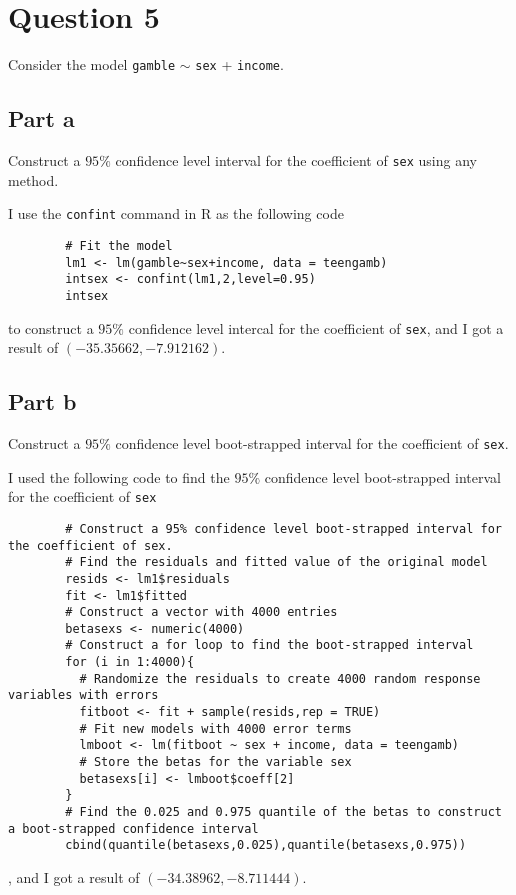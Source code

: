 \section{Question 5}

\begin{question}
    Consider the model \verb+gamble+ $\sim$ \verb+sex+ + \verb+income+.
\end{question}

\subsection{Part a}

\begin{question}
    Construct a $95\%$ confidence level interval for the coefficient of \verb+sex+ using any method.
\end{question}

\begin{answer}
    I use the \verb+confint+ command in R as the following code
    \begin{verbatim}
        # Fit the model
        lm1 <- lm(gamble~sex+income, data = teengamb)
        intsex <- confint(lm1,2,level=0.95)
        intsex
    \end{verbatim}
    to construct a $95\%$ confidence level intercal for the coefficient of \verb+sex+, and I got a result of $(-35.35662,-7.912162)$.
\end{answer}

\subsection{Part b}

\begin{question}
    Construct a $95\%$ confidence level boot-strapped interval for the coefficient of \verb+sex+.
\end{question}

\begin{answer}
    I used the following code to find the $95\%$ confidence level boot-strapped interval for the coefficient of \verb+sex+
    \begin{verbatim}
        # Construct a 95% confidence level boot-strapped interval for the coefficient of sex.
        # Find the residuals and fitted value of the original model
        resids <- lm1$residuals
        fit <- lm1$fitted
        # Construct a vector with 4000 entries
        betasexs <- numeric(4000)
        # Construct a for loop to find the boot-strapped interval
        for (i in 1:4000){
          # Randomize the residuals to create 4000 random response variables with errors
          fitboot <- fit + sample(resids,rep = TRUE)
          # Fit new models with 4000 error terms
          lmboot <- lm(fitboot ~ sex + income, data = teengamb)
          # Store the betas for the variable sex
          betasexs[i] <- lmboot$coeff[2]
        }
        # Find the 0.025 and 0.975 quantile of the betas to construct a boot-strapped confidence interval
        cbind(quantile(betasexs,0.025),quantile(betasexs,0.975))
    \end{verbatim}
    , and I got a result of $(-34.38962,-8.711444)$.
\end{answer}